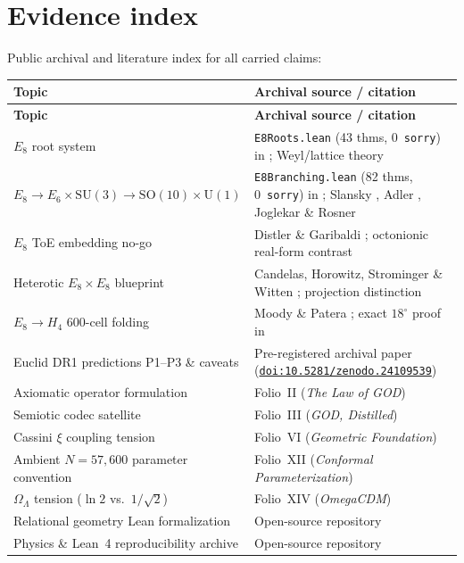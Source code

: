 \documentclass[11pt]{article}
\newcommand{\doi}[1]{\href{https://doi.org/#1}{\nolinkurl{doi:#1}}}
\begin{document}
\section{Evidence index}
\label{app:evidence}
Public archival and literature index for all carried claims:
\begin{longtable}{p{}p{}}
\hline
\textbf{Topic} & \textbf{Archival source / citation} \\
\hline
\endfirsthead
\hline
\textbf{Topic} & \textbf{Archival source / citation} \\
\hline
\endhead
\hline
\endfoot
$E_8$ root system & \texttt{E8Roots.lean} (43 thms, 0~\texttt{sorry}) in \cite{res-nova-repo}; Weyl/lattice theory \cite{slansky} \\
$E_8 \to E_6 \times \mathrm{SU}(3) \to \mathrm{SO}(10) \times \mathrm{U}(1)$ & \texttt{E8Branching.lean} (82 thms, 0~\texttt{sorry}) in \cite{res-nova-repo}; Slansky \cite{slansky}, Adler \cite{adler}, Joglekar \& Rosner \cite{joglekar-rosner} \\
$E_8$ ToE embedding no-go & Distler \& Garibaldi \cite{distler-garibaldi}; octonionic real-form contrast \cite{manogue-dray-wilson} \\
Heterotic $E_8 \times E_8$ blueprint & Candelas, Horowitz, Strominger \& Witten \cite{candelas}; projection distinction \cite{predictions-paper} \\
$E_8 \to H_4$ 600-cell folding & Moody \& Patera \cite{moody-patera}; exact $18^\circ$ proof in \cite{predictions-paper} \\
Euclid DR1 predictions P1--P3 \& caveats & Pre-registered archival paper (\doi{10.5281/zenodo.24109539}) \cite{predictions-paper} \\
Axiomatic operator formulation & Folio~II (\emph{The Law of GOD}) \cite{folio-ii} \\
Semiotic codec satellite & Folio~III (\emph{GOD, Distilled}) \cite{folio-iii} \\
Cassini $\xi$ coupling tension & Folio~VI (\emph{Geometric Foundation}) \cite{folio-vi} \\
Ambient $N=57{,}600$ parameter convention & Folio~XII (\emph{Conformal Parameterization}) \cite{folio-xii} \\
$\Omega_\Lambda$ tension ($\ln 2$ vs.\ $1/\sqrt{2}$) & Folio~XIV (\emph{OmegaCDM}) \cite{folio-xiv} \\
Relational geometry Lean formalization & Open-source repository \cite{four-leibniz} \\
Physics \& Lean~4 reproducibility archive & Open-source repository \cite{res-nova-repo} \\
\hline
\end{longtable}
\end{document}
